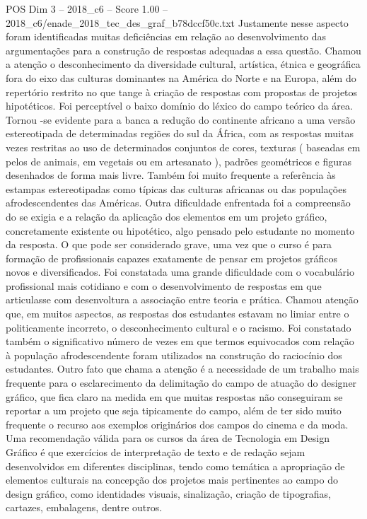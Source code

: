 \begin{textsample}{POS Dim 3 – 2018\_c6 – Score 1.00 – 2018\_c6/enade\_2018\_tec\_des\_graf\_b78dccf50c.txt}
Justamente nesse aspecto foram identificadas muitas deficiências em relação ao desenvolvimento das argumentações para a construção de respostas adequadas a essa questão.
Chamou a atenção o desconhecimento da diversidade cultural, artística, étnica e geográfica fora do eixo das culturas dominantes na América do Norte e na Europa, além do repertório restrito no que tange à criação de respostas com propostas de projetos hipotéticos.
Foi perceptível o baixo domínio do léxico do campo teórico da área.
Tornou -se evidente para a banca a redução do continente africano a uma versão estereotipada de determinadas regiões do sul da África, com as respostas muitas vezes restritas ao uso de determinados conjuntos de cores, texturas ( baseadas em pelos de animais, em vegetais ou em artesanato ), padrões geométricos e figuras desenhados de forma mais livre.
Também foi muito frequente a referência às estampas estereotipadas como típicas das culturas africanas ou das populações afrodescendentes das Américas.
Outra dificuldade enfrentada foi a compreensão do se exigia e a relação da aplicação dos elementos em um projeto gráfico, concretamente existente ou hipotético, algo pensado pelo estudante no momento da resposta.
O que pode ser considerado grave, uma vez que o curso é para formação de profissionais capazes exatamente de pensar em projetos gráficos novos e diversificados.
Foi constatada uma grande dificuldade com o vocabulário profissional mais cotidiano e com o desenvolvimento de respostas em que articulasse com desenvoltura a associação entre teoria e prática.
Chamou atenção que, em muitos aspectos, as respostas dos estudantes estavam no limiar entre o politicamente incorreto, o desconhecimento cultural e o racismo.
Foi constatado também o significativo número de vezes em que termos equivocados com relação à população afrodescendente foram utilizados na construção do raciocínio dos estudantes.
Outro fato que chama a atenção é a necessidade de um trabalho mais frequente para o esclarecimento da delimitação do campo de atuação do designer gráfico, que fica claro na medida em que muitas respostas não conseguiram se reportar a um projeto que seja tipicamente do campo, além de ter sido muito frequente o recurso aos exemplos originários dos campos do cinema e da moda.
Uma recomendação válida para os cursos da área de Tecnologia em Design Gráfico é que exercícios de interpretação de texto e de redação sejam desenvolvidos em diferentes disciplinas, tendo como temática a apropriação de elementos culturais na concepção dos projetos mais pertinentes ao campo do design gráfico, como identidades visuais, sinalização, criação de tipografias, cartazes, embalagens, dentre outros.

\end{textsample}
